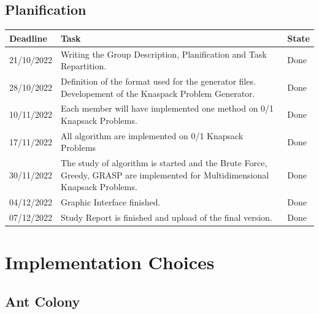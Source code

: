 \documentclass[a4paper, 11pt]{article}
\begin{document}
    \subsection{Planification}
    \begin{center}
        \begin{tabular}{|p{2cm}|p{8cm}|p{2cm}|}
            \hline
            \textbf{Deadline} & \textbf{Task} & \textbf{State} \\
            \hline
            \hline
            21/10/2022 & Writing the Group Description, Planification and Task Repartition. & Done \\
            \hline 
            28/10/2022 & Definition of the format used for the generator files. Developement of the Knaspack Problem Generator. & Done \\
            \hline
            10/11/2022 & Each member will have implemented one method on 0/1 Knapsack Problems. & Done \\
            \hline
            17/11/2022 & All algorithm are implemented on 0/1 Knapsack Problems & Done \\
            \hline 
            30/11/2022 & The study of algorithm is started and the Brute Force, Greedy, GRASP are implemented for Multidimensional Knapsack Problems. & Done \\
            \hline
            04/12/2022 & Graphic Interface finished. & Done \\
            \hline
            07/12/2022 & Study Report is finished and upload of the final version. & Done \\
            \hline
        \end{tabular}
    \end{center}

\section{Implementation Choices}
    \subsection{Ant Colony}
\end{document}
